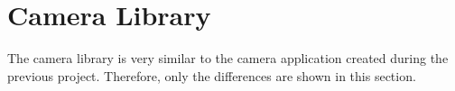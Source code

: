 \section{Camera Library}
\label{sec:inference:camera_library}

The camera library is very similar to the camera application created during the previous project.
Therefore, only the differences are shown in this section.


